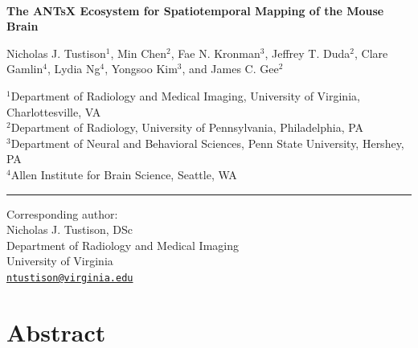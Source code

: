 \documentclass[
  12pt,
]{article}
\author{}
\date{\vspace{-2.5em}}
\begin{document}
\linenumbers
{}


\begin{centering}

$ $

\vspace{6cm}

\LARGE

{\bf The ANTsX Ecosystem for Spatiotemporal Mapping of the Mouse Brain}

\vspace{1.0 cm}

\normalsize

Nicholas J. Tustison$^{1}$,
Min Chen$^{2}$,
Fae N. Kronman$^{3}$,
Jeffrey T. Duda$^{2}$,
Clare Gamlin$^{4}$,
Lydia Ng$^{4}$,
Yongsoo Kim$^{3}$, and
James C. Gee$^{2}$

\small

$^{1}$Department of Radiology and Medical Imaging, University of Virginia, Charlottesville, VA \\
$^{2}$Department of Radiology, University of Pennsylvania, Philadelphia, PA \\
$^{3}$Department of Neural and Behavioral Sciences, Penn State University, Hershey, PA \\
$^{4}$Allen Institute for Brain Science, Seattle, WA \\

\vspace{1.5 cm}

\end{centering}

\vspace{5.5 cm}

\noindent

\rule{4cm}{0.4pt}

\scriptsize

Corresponding author:\\
Nicholas J. Tustison, DSc\\
Department of Radiology and Medical Imaging\\
University of Virginia\\
\href{mailto:ntustison@virginia.edu}{\nolinkurl{ntustison@virginia.edu}}

\normalsize

\newpage


\hypertarget{abstract}{%
\section*{Abstract}\label{abstract}}
\end{document}
